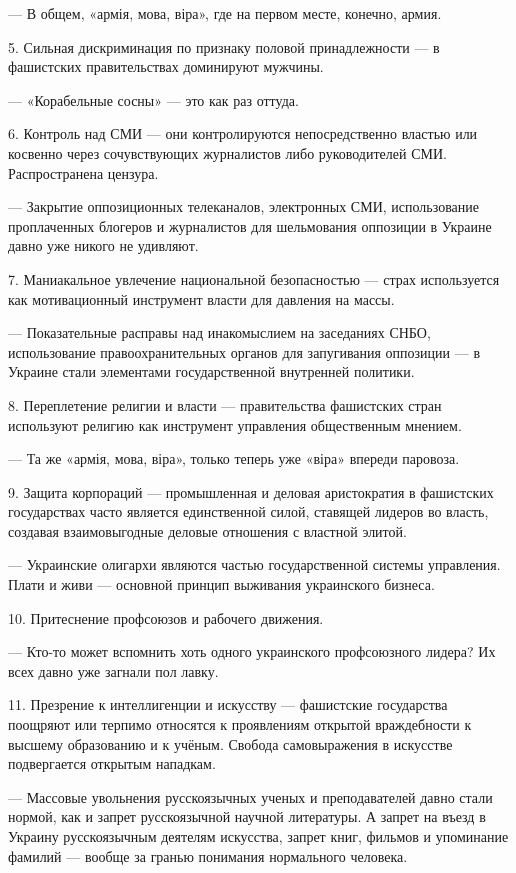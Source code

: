 — В общем, «армія, мова, віра», где на первом месте, конечно, армия. 

5. Сильная дискриминация по признаку половой принадлежности — в фашистских
правительствах доминируют мужчины. 

— «Корабельные сосны» — это как раз оттуда. 

6. Контроль над СМИ — они контролируются непосредственно властью или косвенно
через сочувствующих журналистов либо руководителей СМИ. Распространена цензура.

— Закрытие оппозиционных телеканалов, электронных СМИ, использование
проплаченных блогеров и журналистов для шельмования оппозиции в Украине давно
уже никого не удивляют. 

7. Маниакальное увлечение национальной безопасностью — страх используется как
мотивационный инструмент власти для давления на массы.

— Показательные расправы над инакомыслием на заседаниях СНБО, использование
правоохранительных органов для запугивания оппозиции — в Украине стали
элементами государственной внутренней политики. 

8. Переплетение религии и власти — правительства фашистских стран используют
религию как инструмент управления общественным мнением.

— Та же «армія, мова, віра», только теперь уже «віра» впереди паровоза. 

9. Защита корпораций — промышленная и деловая аристократия в фашистских
государствах часто является единственной силой, ставящей лидеров во власть,
создавая взаимовыгодные деловые отношения с властной элитой.

— Украинские олигархи являются частью государственной системы управления. Плати
и живи — основной принцип выживания украинского бизнеса. 

10. Притеснение профсоюзов и рабочего движения. 

— Кто-то может вспомнить хоть одного украинского профсоюзного лидера? Их всех
давно уже загнали пол лавку. 

11. Презрение к интеллигенции и искусству — фашистские государства поощряют или
терпимо относятся к проявлениям открытой враждебности к высшему образованию и к
учёным. Свобода самовыражения в искусстве подвергается открытым нападкам.

— Массовые увольнения русскоязычных ученых и преподавателей давно стали нормой,
как и запрет русскоязычной научной литературы. А запрет на въезд в Украину
русскоязычным деятелям искусства, запрет книг, фильмов и упоминание фамилий —
вообще за гранью понимания нормального человека. 

